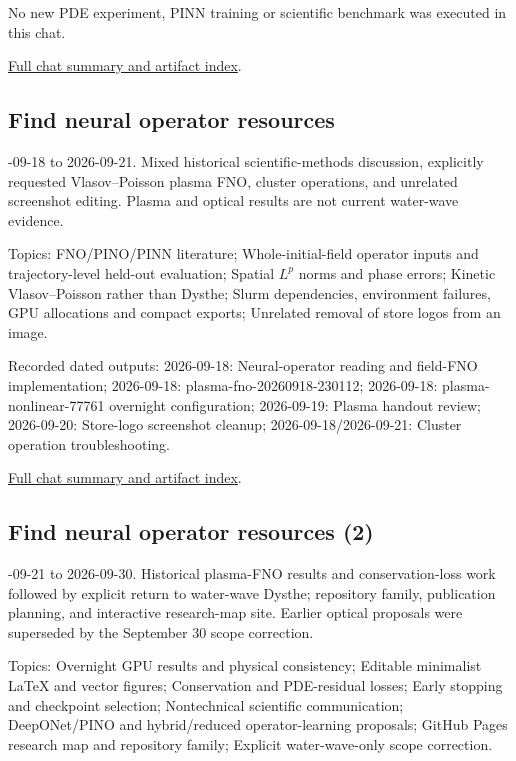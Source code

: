 \documentclass[11pt]{article}
\begin{document}
\noindent No new PDE experiment, PINN training or scientific benchmark was executed in this chat.

\nopagebreak[4]
\noindent\href{https://github.com/matasvai/dysthe-research-map/blob/codex/research-record-2026-11-05/research-record/2026-11-05/CHATS.md#chat-01a0b151-a544-7320-be44-d90f80a6cfb2}{Full chat summary and artifact index}.
\subsection*{Find neural operator resources}
-09-18 to 2026-09-21. Mixed historical scientific-methods discussion, explicitly requested Vlasov--Poisson plasma FNO, cluster operations, and unrelated screenshot editing. Plasma and optical results are not current water-wave evidence.\par
Topics: FNO/PINO/PINN literature; Whole-initial-field operator inputs and trajectory-level held-out evaluation; Spatial $L^p$ norms and phase errors; Kinetic Vlasov--Poisson rather than Dysthe; Slurm dependencies, environment failures, GPU allocations and compact exports; Unrelated removal of store logos from an image.

\noindent Recorded dated outputs: 2026-09-18: Neural-operator reading and field-FNO implementation; 2026-09-18: plasma-fno-20260918-230112; 2026-09-18: plasma-nonlinear-77761 overnight configuration; 2026-09-19: Plasma handout review; 2026-09-20: Store-logo screenshot cleanup; 2026-09-18/2026-09-21: Cluster operation troubleshooting.

\nopagebreak[4]
\noindent\href{https://github.com/matasvai/dysthe-research-map/blob/codex/research-record-2026-11-05/research-record/2026-11-05/CHATS.md#chat-01a0b606-59a1-7e51-8b4b-a962ee7b69bd}{Full chat summary and artifact index}.
\subsection*{Find neural operator resources (2)}
-09-21 to 2026-09-30. Historical plasma-FNO results and conservation-loss work followed by explicit return to water-wave Dysthe; repository family, publication planning, and interactive research-map site. Earlier optical proposals were superseded by the September 30 scope correction.\par
Topics: Overnight GPU results and physical consistency; Editable minimalist LaTeX and vector figures; Conservation and PDE-residual losses; Early stopping and checkpoint selection; Nontechnical scientific communication; DeepONet/PINO and hybrid/reduced operator-learning proposals; GitHub Pages research map and repository family; Explicit water-wave-only scope correction.
\end{document}
